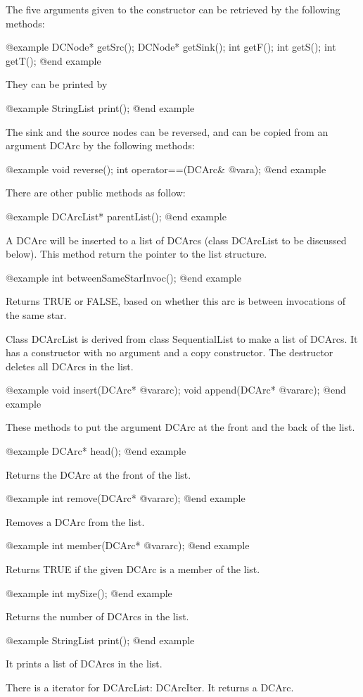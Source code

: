 The five arguments given to the constructor can be retrieved by the following
methods:

@example
DCNode* getSrc();
DCNode* getSink();
int getF();
int getS();
int getT();
@end example

They can be printed by

@example
StringList print();
@end example

The sink and the source nodes can be reversed, and can be copied from
an argument DCArc by the following methods:

@example
void reverse();
int operator==(DCArc& @var{a});
@end example

There are other public methods as follow:

@example
DCArcList* parentList();
@end example

A DCArc will be inserted to a list of DCArcs (class DCArcList to be discussed
below). This method return the pointer to the list structure.

@example
int betweenSameStarInvoc();
@end example

Returns TRUE or FALSE, based on whether this arc is between invocations of
the same star.

Class DCArcList is derived from class SequentialList to make a list of
DCArcs. It has a constructor with no argument and a copy constructor.
The destructor deletes all DCArcs in the list.

@example
void insert(DCArc* @var{arc});
void append(DCArc* @var{arc});
@end example

These methods to put the argument DCArc at the front and the back of the list.

@example
DCArc* head();
@end example

Returns the DCArc at the front of the list.

@example
int remove(DCArc* @var{arc});
@end example

Removes a DCArc from the list.

@example
int member(DCArc* @var{arc});
@end example

Returns TRUE if the given DCArc is a member of the list.

@example
int mySize();
@end example

Returns the number of DCArcs in the list.

@example
StringList print();
@end example

It prints a list of DCArcs in the list.

There is a iterator for DCArcList: DCArcIter. It returns a DCArc.

